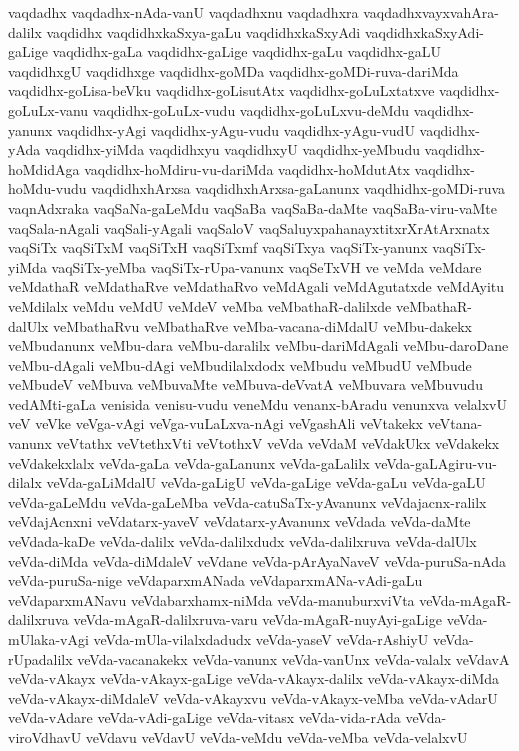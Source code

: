 {vaqdadhx
vaqdadhx-nAda-vanU
vaqdadhxnu
vaqdadhxra
vaqdadhxvayxvahAra-dalilx
vaqdidhx
vaqdidhxkaSxya-gaLu
vaqdidhxkaSxyAdi
vaqdidhxkaSxyAdi-gaLige
vaqdidhx-gaLa
vaqdidhx-gaLige
vaqdidhx-gaLu
vaqdidhx-gaLU
vaqdidhxgU
vaqdidhxge
vaqdidhx-goMDa
vaqdidhx-goMDi-ruva-dariMda
vaqdidhx-goLisa-beVku
vaqdidhx-goLisutAtx
vaqdidhx-goLuLxtatxve
vaqdidhx-goLuLx-vanu
vaqdidhx-goLuLx-vudu
vaqdidhx-goLuLxvu-deMdu
vaqdidhx-yanunx
vaqdidhx-yAgi
vaqdidhx-yAgu-vudu
vaqdidhx-yAgu-vudU
vaqdidhx-yAda
vaqdidhx-yiMda
vaqdidhxyu
vaqdidhxyU
vaqdidhx-yeMbudu
vaqdidhx-hoMdidAga
vaqdidhx-hoMdiru-vu-dariMda
vaqdidhx-hoMdutAtx
vaqdidhx-hoMdu-vudu
vaqdidhxhArxsa
vaqdidhxhArxsa-gaLanunx
vaqdhidhx-goMDi-ruva
vaqnAdxraka
vaqSaNa-gaLeMdu
vaqSaBa
vaqSaBa-daMte
vaqSaBa-viru-vaMte
vaqSala-nAgali
vaqSali-yAgali
vaqSaloV
vaqSaluyxpahanayxtitxrXrAtArxnatx
vaqSiTx
vaqSiTxM
vaqSiTxH
vaqSiTxmf
vaqSiTxya
vaqSiTx-yanunx
vaqSiTx-yiMda
vaqSiTx-yeMba
vaqSiTx-rUpa-vanunx
vaqSeTxVH
ve
veMda
veMdare
veMdathaR
veMdathaRve
veMdathaRvo
veMdAgali
veMdAgutatxde
veMdAyitu
veMdilalx
veMdu
veMdU
veMdeV
veMba
veMbathaR-dalilxde
veMbathaR-dalUlx
veMbathaRvu
veMbathaRve
veMba-vacana-diMdalU
veMbu-dakekx
veMbudanunx
veMbu-dara
veMbu-daralilx
veMbu-dariMdAgali
veMbu-daroDane
veMbu-dAgali
veMbu-dAgi
veMbudilalxdodx
veMbudu
veMbudU
veMbude
veMbudeV
veMbuva
veMbuvaMte
veMbuva-deVvatA
veMbuvara
veMbuvudu
vedAMti-gaLa
venisida
venisu-vudu
veneMdu
venanx-bAradu
venunxva
velalxvU
veV
veVke
veVga-vAgi
veVga-vuLaLxva-nAgi
veVgashAli
veVtakekx
veVtana-vanunx
veVtathx
veVtethxVti
veVtothxV
veVda
veVdaM
veVdakUkx
veVdakekx
veVdakekxlalx
veVda-gaLa
veVda-gaLanunx
veVda-gaLalilx
veVda-gaLAgiru-vu-dilalx
veVda-gaLiMdalU
veVda-gaLigU
veVda-gaLige
veVda-gaLu
veVda-gaLU
veVda-gaLeMdu
veVda-gaLeMba
veVda-catuSaTx-yAvanunx
veVdajacnx-ralilx
veVdajAcnxni
veVdatarx-yaveV
veVdatarx-yAvanunx
veVdada
veVda-daMte
veVdada-kaDe
veVda-dalilx
veVda-dalilxdudx
veVda-dalilxruva
veVda-dalUlx
veVda-diMda
veVda-diMdaleV
veVdane
veVda-pArAyaNaveV
veVda-puruSa-nAda
veVda-puruSa-nige
veVdaparxmANada
veVdaparxmANa-vAdi-gaLu
veVdaparxmANavu
veVdabarxhamx-niMda
veVda-manuburxviVta
veVda-mAgaR-dalilxruva
veVda-mAgaR-dalilxruva-varu
veVda-mAgaR-nuyAyi-gaLige
veVda-mUlaka-vAgi
veVda-mUla-vilalxdadudx
veVda-yaseV
veVda-rAshiyU
veVda-rUpadalilx
veVda-vacanakekx
veVda-vanunx
veVda-vanUnx
veVda-valalx
veVdavA
veVda-vAkayx
veVda-vAkayx-gaLige
veVda-vAkayx-dalilx
veVda-vAkayx-diMda
veVda-vAkayx-diMdaleV
veVda-vAkayxvu
veVda-vAkayx-veMba
veVda-vAdarU
veVda-vAdare
veVda-vAdi-gaLige
veVda-vitasx
veVda-vida-rAda
veVda-viroVdhavU
veVdavu
veVdavU
veVda-veMdu
veVda-veMba
veVda-velalxvU
}
